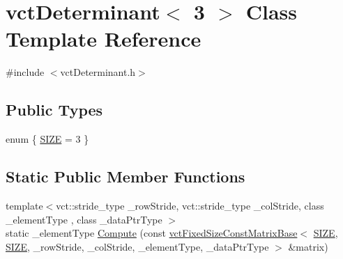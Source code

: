 \hypertarget{classvct_determinant_3_013_01_4}{}\section{vct\+Determinant$<$ 3 $>$ Class Template Reference}
\label{classvct_determinant_3_013_01_4}


{\ttfamily \#include $<$vct\+Determinant.\+h$>$}

\subsection*{Public Types}
\begin{DoxyCompactItemize}
\item 
enum \{ \hyperlink{classvct_determinant_3_013_01_4_a964ab489f1d49147a28785b1855baaaeae80921081f11f0f0611adf3a93f0c07a}{S\+I\+Z\+E} = 3
 \}
\end{DoxyCompactItemize}
\subsection*{Static Public Member Functions}
\begin{DoxyCompactItemize}
\item 
{\footnotesize template$<$vct\+::stride\+\_\+type \+\_\+row\+Stride, vct\+::stride\+\_\+type \+\_\+col\+Stride, class \+\_\+element\+Type , class \+\_\+data\+Ptr\+Type $>$ }\\static \+\_\+element\+Type \hyperlink{classvct_determinant_3_013_01_4_a01cb97fb0a93af7ec91244b3a13a6ae2}{Compute} (const \hyperlink{classvct_fixed_size_const_matrix_base}{vct\+Fixed\+Size\+Const\+Matrix\+Base}$<$ \hyperlink{classvct_determinant_3_013_01_4_a964ab489f1d49147a28785b1855baaaeae80921081f11f0f0611adf3a93f0c07a}{S\+I\+Z\+E}, \hyperlink{classvct_determinant_3_013_01_4_a964ab489f1d49147a28785b1855baaaeae80921081f11f0f0611adf3a93f0c07a}{S\+I\+Z\+E}, \+\_\+row\+Stride, \+\_\+col\+Stride, \+\_\+element\+Type, \+\_\+data\+Ptr\+Type $>$ \&matrix)
\end{DoxyCompactItemize}


